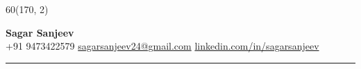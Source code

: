 \documentclass[]{vn-resume}
\begin{document}
%
%
\begin{textblock}{60}(170, 2)
    \lastupdated \\
\end{textblock}

\begin{center}
    {\color{subheadings}\sffamily\bfseries\fontsize{28pt}{40pt}\selectfont Sagar Sanjeev} \\[6pt]
    \small
    +91 9473422579 \quad \textbar \quad
    \href{mailto:sagarsanjeev24@gmail.com}{sagarsanjeev24@gmail.com} \quad \textbar \quad
    \href{https://www.linkedin.com/in/sagarsanjeev/}{linkedin.com/in/sagarsanjeev}
\end{center}
\vspace{-10pt} 
\noindent\rule{\textwidth}{0.4pt}
\end{document}
